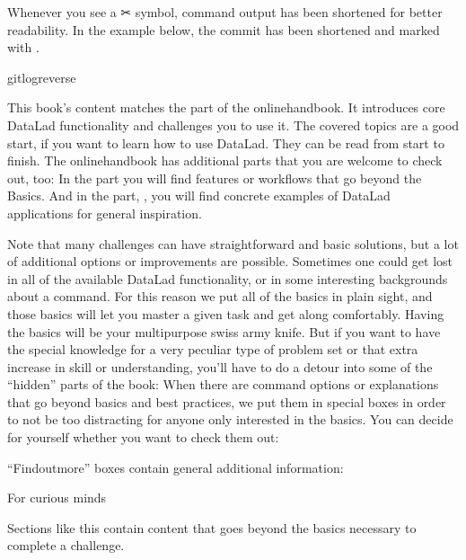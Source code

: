 \sphinxAtStartPar
Whenever you see a ✂ symbol, command output has been shortened for better readability.
In the example below, the commit {\hyperref[\detokenize{glossary:term-shasum}]{}} has been shortened and marked with .

\begin{sphinxVerbatim}[commandchars=\\\{\}]
gitlog\PYGZhy{}\PYGZhy{}reverse
\end{sphinxVerbatim}

\sphinxAtStartPar
This book’s content matches the  part of the online\sphinxhyphen{}handbook.
It introduces core DataLad functionality and challenges you to use it.
The covered topics are a good start, if you want to learn how to use DataLad.
They can be read from start to finish.
The online\sphinxhyphen{}handbook has additional parts that you are welcome to check
out, too:
In the  part you will find features or workflows that go beyond the
Basics.
And in the part, , you will find concrete examples of
DataLad applications for general inspiration.

\sphinxAtStartPar
Note that many challenges can have straightforward and basic solutions,
but a lot of additional options or improvements are possible.
Sometimes one could get lost in all of the available DataLad functionality,
or in some interesting backgrounds about a command.
For this reason we put all of the basics in plain sight, and those basics
will let you master a given task and get along comfortably.
Having the basics will be your multi\sphinxhyphen{}purpose swiss army knife.
But if you want to have the special knowledge for a very peculiar type
of problem set or that extra increase in skill or understanding,
you’ll have to do a detour into some of the “hidden” parts of the book:
When there are command options or explanations that go beyond basics and
best practices, we put them in special boxes in order
to not be too distracting for anyone only interested in the basics.
You can decide for yourself whether you want to check them out:

\sphinxAtStartPar
“Find\sphinxhyphen{}out\sphinxhyphen{}more” boxes contain general additional information:
\begin{findoutmore}[label={fom-intro}, before title={\thetcbcounter\ }, check odd page=true]{For curious minds}
\label{\detokenize{intro/narrative:fom-intro}}

\sphinxAtStartPar
Sections like this contain content that goes beyond the basics
necessary to complete a challenge.


\end{findoutmore}

